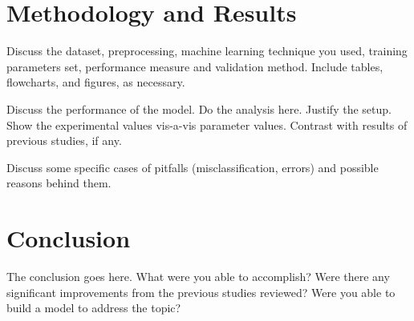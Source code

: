 \documentclass[conference]{IEEEtran}
\begin{document}
\section{Methodology and Results}
Discuss the dataset, preprocessing, machine learning technique you used, training parameters set, performance measure and validation method.
Include tables, flowcharts, and figures, as necessary.

Discuss the performance of the model. Do the analysis here. Justify the setup. Show the experimental values vis-a-vis parameter values. Contrast with results of previous studies, if any. 

Discuss some specific cases of pitfalls (misclassification, errors) and possible reasons behind them.
\section{Conclusion}
The conclusion goes here. What were you able to accomplish? Were there any significant improvements from the previous studies reviewed? Were you able to build a model to address the topic?





\end{document}
